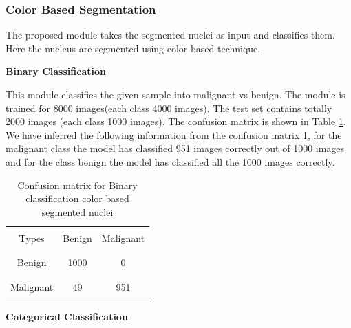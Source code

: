 \documentclass[conference]{IEEEtran}
\begin{document}
\subsubsection{Color Based Segmentation}
The proposed module takes the segmented nuclei as input and classifies them. Here the nucleus are segmented using color based technique.

\newline
\textbf{Binary Classification}
%


This module classifies the given sample into malignant vs benign. The module is trained for 8000 images(each class 4000 images). The test set contains totally 2000 images (each class 1000 images). The confusion matrix is shown in Table \ref{table5}. We have inferred the following information from the confusion matrix \ref{table5}, for the malignant class the model has classified 951 images correctly out of 1000 images and for the class benign the model has classified all the 1000 images correctly.

\begin{table}
\begin{center}
\begin{tabular}[scale=2.0]{ | c |c  |c  | }
  \hline        
  &  &\\
  Types  & Benign & Malignant  \\
  & & \\
   \hline
   &  & \\
  Benign & 1000  &  0   \\ 
  & & \\
  \hline
  &  & \\
  Malignant  & 49 &  951   \\
  & & \\
  \hline  
\end{tabular}
\caption{Confusion matrix for Binary classification color based segmented nuclei}
\label{table5}
\end{center}
\end{table}
\newpage



\newline
\textbf{Categorical Classification}
%
\end{document}
